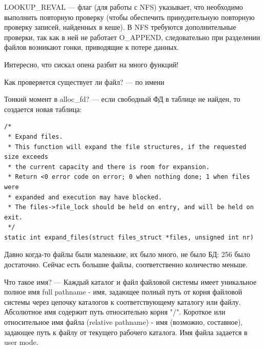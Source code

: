 LOOKUP\_REVAL --- флаг (для работы с NFS) указывает, что необходимо выполнить повторную проверку (чтобы обеспечить принудительную повторную проверку записей, найденных в кеше). В NFS требуются дополнительные проверки, так как в ней не работает O\_APPEND, следовательно при разделении файлов возникают гонки, приводящие к потере данных.

Интересно, что сискал опена разбит на много функций!

Как проверяется существует ли файл? --- по имени

Тонкий момент в alloc\_fd? --- если свободный ФД в таблице не найден, то создается новая таблица:

\begin{lstlisting}
/*
 * Expand files.
 * This function will expand the file structures, if the requested size exceeds
 * the current capacity and there is room for expansion.
 * Return <0 error code on error; 0 when nothing done; 1 when files were
 * expanded and execution may have blocked.
 * The files->file_lock should be held on entry, and will be held on exit.
 */
static int expand_files(struct files_struct *files, unsigned int nr)
\end{lstlisting}

Давно когда-то файлы были маленькие, их было много, не было БД: 256 было достаточно. Сейчас есть большие файлы, соответственно количество меньше.

Что такое имя? --- Каждый каталог и файл файловой системы имеет уникальное полное имя full pathname - имя, задающее полный путь от корня файловой системы через цепочку каталогов к соответствующему каталогу или файлу.  Абсолютное имя содержит путь относительно корня "/". Короткое или относительное имя файла (relative pathname) - имя (возможно, составное), задающее путь к файлу от текущего рабочего каталога. Имя файла задается в user mode.


